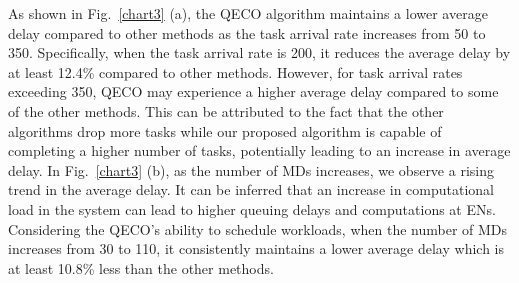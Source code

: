 \documentclass[12pt,draftclsnofoot,onecolumn]{IEEEtran}
\begin{document}
As shown in Fig.~\ref{chart3} (a), the QECO algorithm maintains a lower average delay compared to other methods as the task arrival rate increases from 50 to 350. Specifically, when the task arrival rate is 200, it reduces the average delay by at least 12.4\% compared to other methods. However, for task arrival rates exceeding 350, QECO may experience a higher average delay compared to some of the other methods. This can be attributed to the fact that the other algorithms drop more tasks while our proposed algorithm is capable of completing a higher number of tasks, potentially leading to an increase in average delay. In Fig.~\ref{chart3} (b), as the number of MDs increases, we observe a rising trend in the average delay. It can be inferred that an increase in computational load in the system can lead to higher queuing delays and computations at ENs. Considering the QECO's ability to schedule workloads, when the number of MDs increases from 30 to 110, it consistently maintains a lower average delay which is at least 10.8\% less than the other methods.


\end{document}
